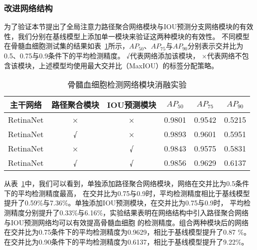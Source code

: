 \subsubsection{改进网络结构}
为了验证本节提出了全局注意力路径聚合网络模块与IOU预测分支网络模块的有效性，我们分别在基线模型上添加单一模块来验证这两种模块的有效性。
不同模型在骨髓血细胞测试集的结果如表~\ref{table:net_ablation}所示，$AP_{50}$、$AP_{75}$与$AP_{90}$分别表示交并比为0.5、0.75与0.9条件下的平均检测精度。
√代表网络添加该模块， ×代表网络不包含该模块，上述模型均使用最大交并比（MaxIOU）的标签分配策略。
\begin{table}[htbp]
  \caption{骨髓血细胞检测网络模块消融实验}   
  \centering 
  \label{table:net_ablation}
  \begin{tabular*}{0.90\hsize}{@{}@{\extracolsep{\fill}}cccccc@{}}
    \toprule[1pt]
    主干网络  & 路径聚合模块 & IOU预测模块 &$AP_{50}$ & $AP_{75}$ & $AP_{90}$ \\
    \midrule[1pt] 
    RetinaNet    & × & × & 0.9801 & 0.9542 &  0.5215  \\
    RetinaNet    & √ & × & 0.9893 & 0.9601 &  0.5951  \\ 
    RetinaNet    & × & √ & 0.9843 & 0.9575 & 0.5831     \\ 
    RetinaNet    & √ & √ & 0.9856 & 0.9629 &  0.6137  \\ 
    \bottomrule[1pt]      
  \end{tabular*} 
\end{table}

从表~\ref{table:net_ablation}中，我们可以看到，单独添加路径聚合网络模块，网络在交并比为0.5条件下的平均检测精度最高，
在交并比为0.75与0.9时，平均检测精度相比于基线模型提升了0.59\%与7.36\%。单独添加IOU预测模块，在交并比为0.75与0.9时，
平均检测精度分别提升了0.33\%与6.16\%，实验结果表明在网络结构中引入路径聚合网络与IOU预测网络均可以有效提高骨髓血细胞
的检测精度。组合两种模块后的网络在交并比为0.75条件下的平均检测精度为0.9629，相比于基线模型提升了0.87 \%。
在交并比为0.90条件下的平均检测精度为0.6137，相比于基线模型提升了9.22\%。
